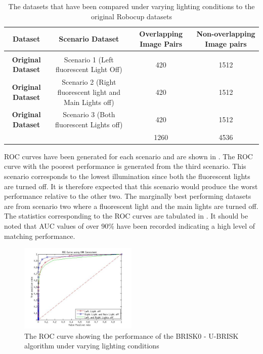 \documentclass{article}
\begin{document}
\begin{table}
\caption{The datasets that have been compared under varying lighting conditions
to the original Robocup datasets}


\begin{tabular}{|c|c|c|c|}
\hline 
\textbf{Dataset} & \textbf{Scenario Dataset} & \textbf{Overlapping Image Pairs} & \textbf{Non-overlapping Image pairs}\tabularnewline
\hline 
\hline 
 &  &  & \tabularnewline
\hline 
\textbf{Original Dataset} & Scenario 1 (Left fluorescent Light Off) & 420 & 1512\tabularnewline
\hline 
\textbf{Original Dataset} & Scenario 2 (Right fluorescent light and Main Lights off) & 420 & 1512\tabularnewline
\hline 
\textbf{Original Dataset} & Scenario 3 (Both fluorescent Lights off) & 420 & 1512\tabularnewline
\hline 
 &  & 1260 & 4536\tabularnewline
\hline 
\end{tabular}
\label{tab:datasetLighting}
\end{table}

ROC curves have been generated for each scenario and are shown in . The ROC curve with the poorest performance is generated from the third scenario. This scenario corresponds to the lowest illumination since both the fluorescent lights are turned off. It is therefore expected that this scenario would produce the worst performance relative to the other two. The marginally best performing datasets are from scenario two where a fluorescent light and the main lights are turned off. \\

The statistics corresponding to the ROC curves are tabulated in . It should be noted that AUC values of over $90\%$ have been recorded indicating a high level of matching performance. \\


\begin{figure}[h!] 
  \centering
    \includegraphics[width=0.5\textwidth]{../Drawings/lighting/ROC_Lighting.jpg}
    \caption{The ROC curve showing the performance of the BRISK0 - U-BRISK algorithm under varying lighting conditions}
    \label{fig:rocLighting}
\end{figure}
\end{document}
